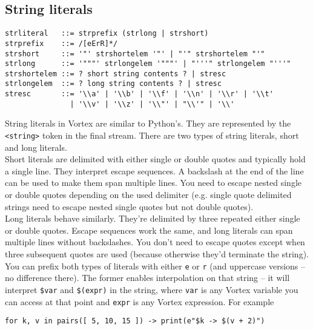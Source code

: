 \documentclass{article}
\begin{document}
\subsection{String literals}
\begin{lstlisting}[language=bnf]
strliteral   ::= strprefix (strlong | strshort)
strprefix    ::= /[eErR]*/
strshort     ::= '"' strshortelem '"' | "'" strshortelem "'"
strlong      ::= '"""' strlongelem '"""' | "'''" strlongelem "'''"
strshortelem ::= ? short string contents ? | stresc
strlongelem  ::= ? long string contents ? | stresc
stresc       ::= '\\a' | '\\b' | '\\f' | '\\n' | '\\r' | '\\t'
               | '\\v' | '\\z' | '\\"' | "\\'" | '\\'
\end{lstlisting}
String literals in Vortex are similar to Python's. They are represented by the
\verb|<string>| token in the final stream. There are two types of string
literals, short and long literals.\\
Short literals are delimited with either single or double quotes and
typically hold a single line. They interpret escape sequences. A backslash at
the end of the line can be used to make them span multiple lines. You need to
escape nested single or double quotes depending on the used delimiter (e.g.
single quote delimited strings need to escape nested single quotes but
not double quotes).\\
Long literals behave similarly. They're delimited by three repeated either
single or double quotes. Escape sequences work the same, and long literals can
span multiple lines without backslashes. You don't need to escape quotes except
when three subsequent quotes are used (because otherwise they'd terminate the
string).\\
You can prefix both types of literals with either \verb|e| or \verb|r| (and
uppercase versions -- no difference there). The former enables interpolation
on that string -- it will interpret \verb|$var| and \verb|$(expr)| in the
string, where \verb|var| is any Vortex variable you can access at that point
and \verb|expr| is any Vortex expression. For example
\begin{lstlisting}[language=vortex]
for k, v in pairs([ 5, 10, 15 ]) -> print(e"$k -> $(v + 2)")
\end{lstlisting}
\end{document}
